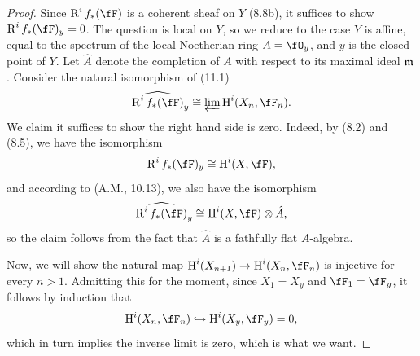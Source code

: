 \documentclass[a4paper]{article}
\begin{document}
\begin{enumerate} [label=\textbf{\arabic*.}, leftmargin=0em]
          \begin{proof}
              Since $\dR^i f_*(\fF)$ is a coherent sheaf on $Y$ (8.8b), it suffices to show $\dR^if_*(\fF)_y = 0$.
              The question is local on $Y$, so we reduce to the case $Y$ is affine, equal to the spectrum of the local Noetherian ring $A = \fO_y$, and $y$ is the closed point of $Y$.
              Let $\hat{A}$ denote the completion of $A$ with respect to its maximal ideal $\mathfrak{m}$.
              Consider the natural isomorphism of (11.1)
              \begin{equation*}
                  \widehat{\dR^if_*(\fF)}_y \cong \varprojlim \cH^i(X_n, \fF_n).
              \end{equation*}
              We claim it suffices to show the right hand side is zero.
              Indeed, by (8.2) and (8.5), we have the isomorphism
              \begin{equation*}
                  \dR^if_*(\fF)_y \cong \cH^i(X, \fF),
              \end{equation*}
              and according to (A.M., 10.13), we also have the isomorphism
              \begin{equation*}
                  \widehat{\dR^if_*(\fF)}_y \cong \cH^i(X, \fF) \otimes \hat{A},
              \end{equation*}
              so the claim follows from the fact that $\hat{A}$ is a fathfully flat $A$-algebra.

              Now, we will show the natural map $\cH^i(X_{n + 1}) \to \cH^i(X_n, \fF_n)$ is injective for every $n > 1$.
              Admitting this for the moment, since $X_1 = X_y$ and $\fF_1 = \fF_y$, it follows by induction that $$\cH^i(X_n, \fF_n) \hookrightarrow \cH^i(X_y, \fF_y) = 0,$$
              which in turn implies the inverse limit is zero, which is what we want.


\end{proof}
\end{enumerate}
\end{document}
